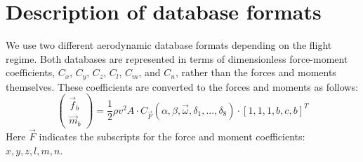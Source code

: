 \documentclass[11pt]{amsart}
\begin{document}

\section{Description of database formats}

We use two different aerodynamic database formats depending on the
flight regime.  Both databases are represented in terms of
dimensionless force-moment coefficients, $C_x$, $C_y$, $C_z$, $C_l$, $C_m$,
and $C_n$, rather than the forces and moments themselves.  These
coefficients are converted to the forces and moments as follows:
\begin{equation}
\label{eqn:force-moment-coefficient}
\left(
\begin{array}{c}
\vec{f}_b \\
\vec{m}_b
\end{array}
\right) = \frac{1}{2} \rho v^2 A
\cdot
C_{\vec{F}}(\alpha, \beta, \vec{\omega}, \delta_1, ..., \delta_8)
\cdot
[1, 1, 1, b, c, b]^T
\end{equation}
Here $\vec{F}$ indicates the subscripts for the force and moment
coefficients: $x, y, z, l, m, n$.
\end{document}
